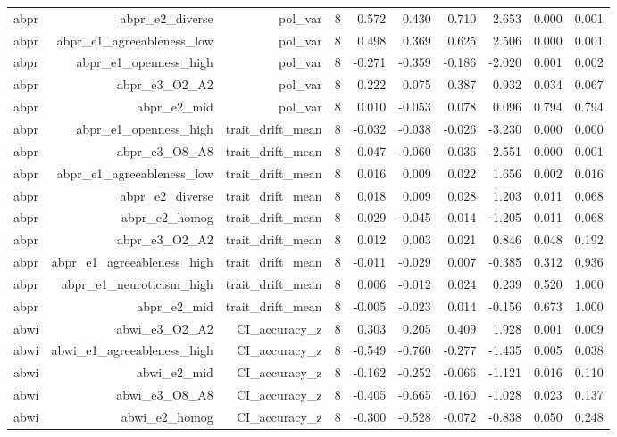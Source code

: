 \documentclass[11pt]{article}
\begin{document}
\begin{landscape}
\begin{longtable}{@{}lrrrrrrrrr@{}}
abpr & abpr\_e2\_diverse & pol\_var & 8 & 0.572 & 0.430 & 0.710 & 2.653 & 0.000 & 0.001 \\
abpr & abpr\_e1\_agreeableness\_low & pol\_var & 8 & 0.498 & 0.369 & 0.625 & 2.506 & 0.000 & 0.001 \\
abpr & abpr\_e1\_openness\_high & pol\_var & 8 & -0.271 & -0.359 & -0.186 & -2.020 & 0.001 & 0.002 \\
abpr & abpr\_e3\_O2\_A2 & pol\_var & 8 & 0.222 & 0.075 & 0.387 & 0.932 & 0.034 & 0.067 \\
abpr & abpr\_e2\_mid & pol\_var & 8 & 0.010 & -0.053 & 0.078 & 0.096 & 0.794 & 0.794 \\
abpr & abpr\_e1\_openness\_high & trait\_drift\_mean & 8 & -0.032 & -0.038 & -0.026 & -3.230 & 0.000 & 0.000 \\
abpr & abpr\_e3\_O8\_A8 & trait\_drift\_mean & 8 & -0.047 & -0.060 & -0.036 & -2.551 & 0.000 & 0.001 \\
abpr & abpr\_e1\_agreeableness\_low & trait\_drift\_mean & 8 & 0.016 & 0.009 & 0.022 & 1.656 & 0.002 & 0.016 \\
abpr & abpr\_e2\_diverse & trait\_drift\_mean & 8 & 0.018 & 0.009 & 0.028 & 1.203 & 0.011 & 0.068 \\
abpr & abpr\_e2\_homog & trait\_drift\_mean & 8 & -0.029 & -0.045 & -0.014 & -1.205 & 0.011 & 0.068 \\
abpr & abpr\_e3\_O2\_A2 & trait\_drift\_mean & 8 & 0.012 & 0.003 & 0.021 & 0.846 & 0.048 & 0.192 \\
abpr & abpr\_e1\_agreeableness\_high & trait\_drift\_mean & 8 & -0.011 & -0.029 & 0.007 & -0.385 & 0.312 & 0.936 \\
abpr & abpr\_e1\_neuroticism\_high & trait\_drift\_mean & 8 & 0.006 & -0.012 & 0.024 & 0.239 & 0.520 & 1.000 \\
abpr & abpr\_e2\_mid & trait\_drift\_mean & 8 & -0.005 & -0.023 & 0.014 & -0.156 & 0.673 & 1.000 \\
abwi & abwi\_e3\_O2\_A2 & CI\_accuracy\_z & 8 & 0.303 & 0.205 & 0.409 & 1.928 & 0.001 & 0.009 \\
abwi & abwi\_e1\_agreeableness\_high & CI\_accuracy\_z & 8 & -0.549 & -0.760 & -0.277 & -1.435 & 0.005 & 0.038 \\
abwi & abwi\_e2\_mid & CI\_accuracy\_z & 8 & -0.162 & -0.252 & -0.066 & -1.121 & 0.016 & 0.110 \\
abwi & abwi\_e3\_O8\_A8 & CI\_accuracy\_z & 8 & -0.405 & -0.665 & -0.160 & -1.028 & 0.023 & 0.137 \\
abwi & abwi\_e2\_homog & CI\_accuracy\_z & 8 & -0.300 & -0.528 & -0.072 & -0.838 & 0.050 & 0.248 \\

\end{longtable}
\end{landscape}
\end{document}
